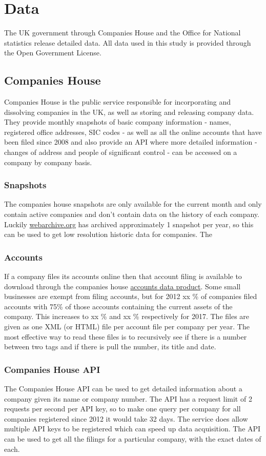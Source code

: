 \documentclass[a4paper,10pt]{article}
\begin{document}
   \section{Data}
   The UK government through Companies House and the Office for National statistics release detailed data. All data used in this study is provided through the Open Government License.
   \subsection{Companies House}
   Companies House is the public service responsible for incorporating and dissolving companies in the UK, as well as storing and releasing company data. They provide monthly snapshots of basic company information - names, registered office addresses, SIC codes - as well as all the online accounts that have been filed since 2008 and also provide an API where more detailed information - changes of address and people of significant control - can be accessed on a company by company basis.
   \subsubsection{Snapshots}
   The companies house snapshots are only available for the current month and only contain active companies and don't contain data on the history of each company. Luckily \href{http://webarchive.org}{webarchive.org} has archived approximately 1 snapshot per year, so this can be used to get low resolution historic data for companies. The 
   \subsubsection{Accounts}
   If a company files its accounts online then that account filing is available to download through the companies house \href{http://download.companieshouse.gov.uk/historicmonthlyaccountsdata.html}{accounts data product}. Some small businesses are exempt from filing accounts, but for 2012 xx \% of companies filed accounts with 75\% of those accounts containing the current assets of the company. This increases to xx \% and xx \% respectively for 2017.
   The files are given as one XML (or HTML) file per account file per company per year. The most effective way to read these files is to recursively see if there is a number between two tags and if there is pull the number, its title and date.
   \subsubsection{Companies House API}
   The Companies House API can be used to get detailed information about a company given its name or company number. The API has a request limit of 2 requests per second per API key, so to make one query per company for all companies registered since 2012 it would take 32 days. The service does allow multiple API keys to be registered which can speed up data acquisition. The API can be used to get all the filings for a particular company, with the exact dates of each.
\end{document}
